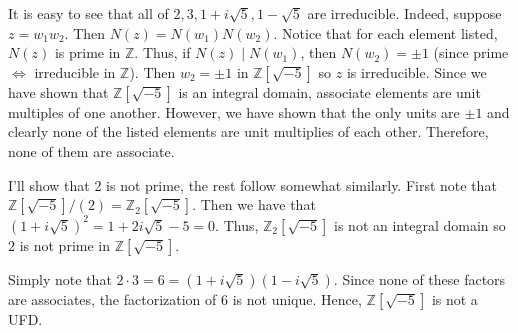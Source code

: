 \documentclass[../../master.tex]{subfiles}
\begin{document}
\begin{solution}
        It is easy to see that all of $2, 3, 1 + i\sqrt{5}, 1 - \sqrt{5}$ are
        irreducible. Indeed, suppose $z = w_1 w_2$. Then $N(z) = N(w_1) N(w_2)$.
        Notice that for each element listed, $N(z)$ is prime in $\mathbb{Z}$.
        Thus, if $N(z) \mid N(w_1)$, then $N(w_2) = \pm 1$ (since prime
        $\Longleftrightarrow$ irreducible in $\mathbb{Z}$). Then $w_2 = \pm 1$ 
        in $\mathbb{Z}[\sqrt{-5}]$ so $z$ is irreducible. Since we have shown
        that $\mathbb{Z}[\sqrt{-5}]$ is an integral domain, associate elements
        are unit multiples of one another. However, we have shown that the only
        units are $\pm 1$ and clearly none of the listed elements are unit
        multiplies of each other. Therefore, none of them are associate.

        I'll show that 2 is not prime, the rest follow somewhat similarly. First
        note that $\mathbb{Z}[\sqrt{-5}] / (2) = \mathbb{Z}_{2}[\sqrt{-5}]$.
        Then we have that $(1 + i \sqrt{5})^2 = 1 + 2i \sqrt{5} - 5 = 0$. Thus,
        $\mathbb{Z}_{2}[\sqrt{-5}]$ is not an integral domain so $2$ is not
        prime in $\mathbb{Z}[\sqrt{-5}]$.

        Simply note that $2 \cdot 3 = 6 = (1 + i \sqrt{5}) ( 1 - i \sqrt{5})$.
        Since none of these factors are associates, the factorization of 6 is
        not unique. Hence, $\mathbb{Z}[\sqrt{-5}]$ is not a UFD.
    \end{solution}
\end{document}
